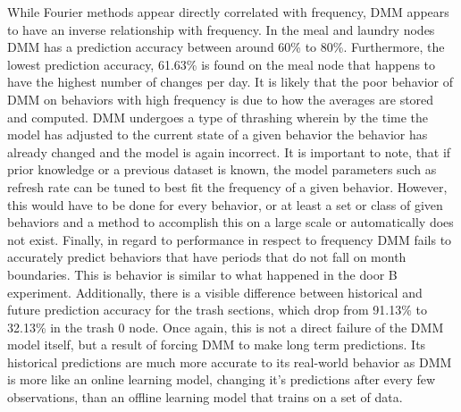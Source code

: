While Fourier methods appear directly correlated with frequency, DMM
appears to have an inverse relationship with frequency. In the meal and
laundry nodes DMM has a prediction accuracy between around 60\% to 80\%.
Furthermore, the lowest prediction accuracy, 61.63\% is found on the meal
node that happens to have the highest number of changes per day. It is likely
that the poor behavior of DMM on behaviors with high frequency is due to
how the averages are stored and computed. DMM undergoes a type of
thrashing wherein by the time the model has adjusted to the current state of a given
behavior the behavior has already changed and the model is again incorrect. It is important to note, that if prior knowledge
or a previous dataset is known, the model parameters such as refresh rate
can be tuned to best fit the frequency of a given behavior.
However, this would have to be done for every behavior, or at least a set or class
of given behaviors and a method to accomplish this on a large scale or automatically does not exist. Finally, in regard to performance in
respect to frequency
DMM fails to accurately predict behaviors that have periods that do not
fall on month boundaries. This is behavior is similar to what happened in the door B experiment.
Additionally, there is a visible difference between historical
and future prediction accuracy for the trash sections, which drop from
91.13\% to 32.13\% in the trash 0 node. Once again, this is not a direct failure
of the DMM model itself, but a result of forcing DMM to make long
term predictions. Its historical predictions are much more accurate to its
real-world behavior as DMM is more like
an online learning model, changing it's predictions after every few observations,
than an offline learning model that trains on a set of data. \\




\begin{table}[htb!]
  \centering
  \caption{Hallway Delivery Section}
  \label{table:Hallway_Delivery_Section}
\end{table}

